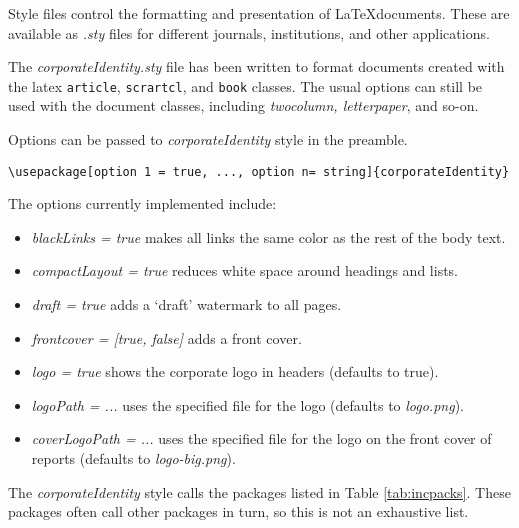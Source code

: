 Style files control the formatting and presentation of \LaTeX documents. These are available as \emph{.sty} files for different journals, institutions, and other applications.

The \emph{corporateIdentity.sty} file has been written to format documents created with the latex \texttt{article}, \texttt{scrartcl}, and \texttt{book} classes. The usual options can still be used with the document classes, including \emph{twocolumn, letterpaper}, and so-on.

Options can be passed to \emph{corporateIdentity} style in the preamble.

\begin{lstlisting}
\usepackage[option 1 = true, ..., option n= string]{corporateIdentity}
\end{lstlisting}

The options currently implemented include:
\begin{itemize}
  \item \emph{blackLinks = true} makes all links the same color as the rest of the body text.
  \item \emph{compactLayout = true} reduces white space around headings and lists.
  \item \emph{draft = true} adds a `draft' watermark to all pages.
  \item \emph{frontcover = [true, false]} adds a front cover.
  \item \emph{logo = true} shows the corporate logo in headers (defaults to true).
  \item \emph{logoPath = ...} uses the specified file for the logo (defaults to \emph{logo.png}).
  \item \emph{coverLogoPath = ...} uses the specified file for the logo on the front cover of reports (defaults to \emph{logo-big.png}).
\end{itemize}

The \emph{corporateIdentity} style calls the packages listed in Table \ref{tab:incpacks}. These packages often call other packages in turn, so this is not an exhaustive list.

